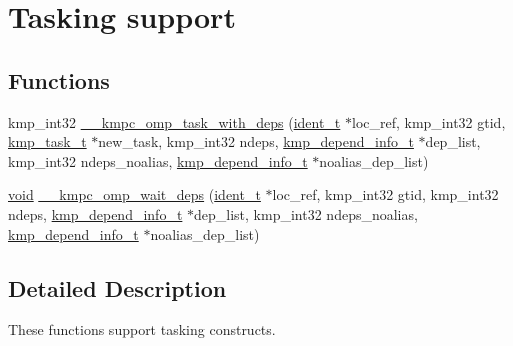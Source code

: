 \hypertarget{group__TASKING}{\section{Tasking support}
\label{group__TASKING}
}
\subsection*{Functions}
\begin{DoxyCompactItemize}
\item 
kmp\-\_\-int32 \hyperlink{group__TASKING_ga8b2a95073f7a4a81055899ee6a93ecee}{\-\_\-\-\_\-kmpc\-\_\-omp\-\_\-task\-\_\-with\-\_\-deps} (\hyperlink{group__BASIC__TYPES_ga690fda6b92f039a72db263c6b4394ddb}{ident\-\_\-t} $\ast$loc\-\_\-ref, kmp\-\_\-int32 gtid, \hyperlink{group__BASIC__TYPES_ga2783514e154e897944132a3ba6ed8789}{kmp\-\_\-task\-\_\-t} $\ast$new\-\_\-task, kmp\-\_\-int32 ndeps, \hyperlink{kmp_8h_a5a3e923c826c972a9ebb1254d39f4286}{kmp\-\_\-depend\-\_\-info\-\_\-t} $\ast$dep\-\_\-list, kmp\-\_\-int32 ndeps\-\_\-noalias, \hyperlink{kmp_8h_a5a3e923c826c972a9ebb1254d39f4286}{kmp\-\_\-depend\-\_\-info\-\_\-t} $\ast$noalias\-\_\-dep\-\_\-list)
\item 
\hyperlink{ittnotify__static_8h_af941d56e55e3c5465135b60c4d6343ed}{void} \hyperlink{group__TASKING_gab53273918f995639450c4dcbed02df88}{\-\_\-\-\_\-kmpc\-\_\-omp\-\_\-wait\-\_\-deps} (\hyperlink{group__BASIC__TYPES_ga690fda6b92f039a72db263c6b4394ddb}{ident\-\_\-t} $\ast$loc\-\_\-ref, kmp\-\_\-int32 gtid, kmp\-\_\-int32 ndeps, \hyperlink{kmp_8h_a5a3e923c826c972a9ebb1254d39f4286}{kmp\-\_\-depend\-\_\-info\-\_\-t} $\ast$dep\-\_\-list, kmp\-\_\-int32 ndeps\-\_\-noalias, \hyperlink{kmp_8h_a5a3e923c826c972a9ebb1254d39f4286}{kmp\-\_\-depend\-\_\-info\-\_\-t} $\ast$noalias\-\_\-dep\-\_\-list)
\end{DoxyCompactItemize}


\subsection{Detailed Description}
These functions support tasking constructs. 

